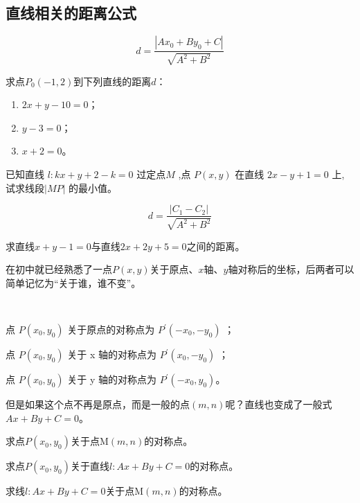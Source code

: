 \subsection{直线相关的距离公式}
\begin{theorem}
    \begin{equation}
          d=\frac{|Ax_0+By_0+C|}{\sqrt{A^2+B^2}}
    \end{equation}
\end{theorem}
\begin{exercise}
    求点\(P_0(-1,2)\)到下列直线的距离\(d\)：
    \begin{enumerate}[(1)]
        \setlength{\itemsep}{-\itemsep}
        \item \(2x+y-10=0\)；
        \item \(y-3=0\)；
        \item \(x+2=0\)。
    \end{enumerate}
\end{exercise}
\begin{example}
    已知直线 $ l: k x+y+2-k=0 $ 过定点$  M$ ,点 $ P(x, y)$  在直线 $ 2 x-y+1=0$  上, 试求线段$  |M P| $ 的最小值。
\end{example}
\begin{theorem}
    \begin{equation}
          d=\frac{|C_1-C_2|}{\sqrt{A^2+B^2}}
    \end{equation}
\end{theorem}
\begin{exercise}
    求直线\(x+y-1=0\)与直线\(2x+2y+5=0\)之间的距离。
\end{exercise}
在初中就已经熟悉了一点\(P(x,y)\)关于原点、\(x\)轴、\(y\)轴对称后的坐标，后两者可以简单记忆为“关于谁，谁不变”。
\begin{character}
    \ 

 点 $ P\left(x_{0}, y_{0}\right)$ 关于原点的对称点为 $P^{\prime}\left(-x_{0},-y_{0}\right)$ ；

 点  $P\left(x_{0}, y_{0}\right)$  关于  x  轴的对称点为 $ P^{\prime}\left(x_{0},-y_{0}\right)$ ；

  点 $ P\left(x_{0}, y_{0}\right)$  关于  y  轴的对称点为  $P^{\prime}\left(-x_{0}, y_{0}\right) $。
\end{character}

但是如果这个点不再是原点，而是一般的点\((m,n)\)呢？直线也变成了一般式\(Ax+By+C=0\)。
\begin{example}
    求点\(P(x_0,y_0)\)关于点M\((m,n)\)的对称点。
\end{example}
\begin{example}
    求点\(P(x_0,y_0)\)关于直线\(l:Ax+By+C=0\)的对称点。
\end{example}
\begin{example}
    求线\(l:Ax+By+C=0\)关于点M\((m,n)\)的对称点。
\end{example}

